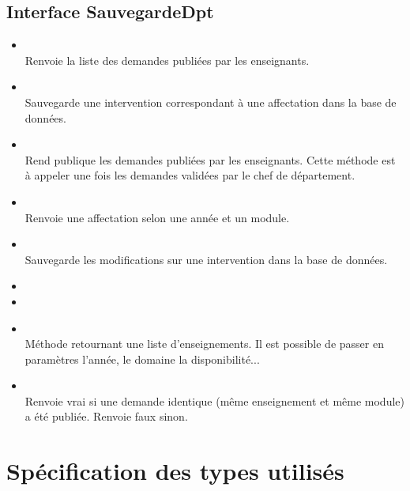	\subsection{Interface SauvegardeDpt}
	
	    \begin{itemize}
	        \item {}\\
	        Renvoie la liste des demandes publiées par les enseignants.
	        
	        \item {}\\
	        Sauvegarde une intervention correspondant à une affectation dans la base de données. 
	        
	        \item {}\\
	        Rend publique les demandes publiées par les enseignants. Cette méthode est à appeler une fois les demandes validées par le chef de département.
	        
	        \item {}\\
	        Renvoie une affectation selon une année et un module.
	        
	        \item {}\\
	        Sauvegarde les modifications sur une intervention dans la base de données.
	        
	        \item {}
	        \item {}
	        \item {}\\
        	Méthode retournant une liste d'enseignements. Il est possible de passer en paramètres l'année, le domaine la disponibilité...
	        
	        \item {}\\
	        Renvoie vrai si une demande identique (même enseignement et même module) a été publiée. Renvoie faux sinon.
	  
	    \end{itemize}	

\section{Spécification des types utilisés}

